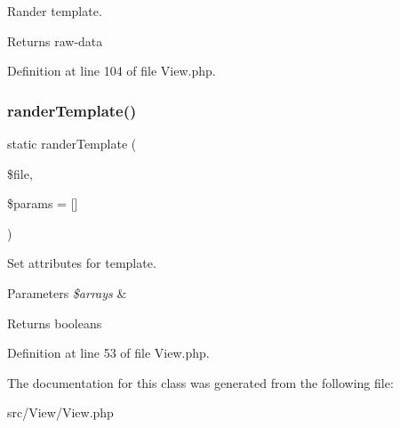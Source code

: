 Rander template.

\begin{DoxyReturn}{Returns}
raw-\/data 
\end{DoxyReturn}


Definition at line 104 of file View.\+php.

\mbox{\label{class_zest_1_1_view_1_1_view_a9f3e0779913ae33f6f67726498e37815}} 
\subsubsection{\texorpdfstring{rander\+Template()}{randerTemplate()}}
{\footnotesize\ttfamily static rander\+Template (\begin{DoxyParamCaption}\item[{}]{\$file,  }\item[{}]{\$params = {\ttfamily \mbox{[}\mbox{]}} }\end{DoxyParamCaption})\hspace{0.3cm}{\ttfamily [static]}}

Set attributes for template.


\begin{DoxyParams}{Parameters}
{\em \$arrays} & \\
\hline
\end{DoxyParams}
\begin{DoxyReturn}{Returns}
booleans 
\end{DoxyReturn}


Definition at line 53 of file View.\+php.



The documentation for this class was generated from the following file\+:\begin{DoxyCompactItemize}
\item 
src/\+View/View.\+php\end{DoxyCompactItemize}
